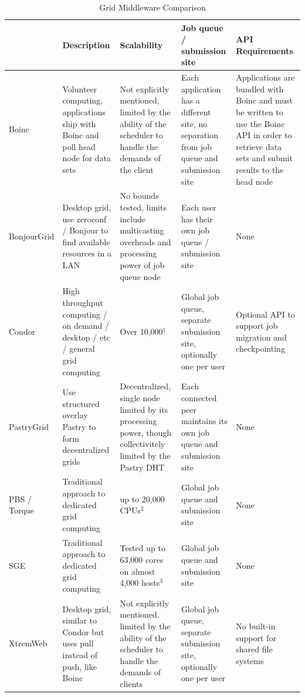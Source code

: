 \documentclass[conference]{IEEEtran}
\begin{document}
\begin{table}[ht]
\small{
\centering
\begin{tabular}[c]{|p{1.4cm}||p{3.475cm}|p{3.475cm}|p{3.475cm}|p{3.475cm}|} \hline
& Description & Scalability & Job queue / submission site & API Requirements \\ \hline \hline
Boinc &
Volunteer computing, applications ship with Boinc and poll head node for data
sets &
Not explicitly mentioned, limited by the ability of the scheduler to handle
the demands of the client &
Each application has a different site, no separation from job queue and
submission site &
Applications are bundled with Boinc and must be written to use the Boinc API
in order to retrieve data sets and submit results to the head node
\\ \hline
BonjourGrid &
Desktop grid, use zeroconf / Bonjour to find available resources in a LAN &
No bounds tested, limits include multicasting overheads and processing power
of job queue node &
Each user has their own job queue / submission site &
None \\ \hline
Condor &
High throughput computing / on demand / desktop / etc / general grid computing &
Over 10,000$^{1}$ &
Global job queue, separate submission site, optionally one per user &
Optional API to support job migration and checkpointing \\ \hline
PastryGrid &
Use structured overlay Pastry to form decentralized grids &
Decentralized, single node limited by its processing power, though
collectivitely limited by the Pastry DHT &
Each connected peer maintains its own job queue and submission site &
None \\ \hline
PBS / Torque~\cite{torque} &
Traditional approach to dedicated grid computing &
up to 20,000 CPUs$^{2}$ &
Global job queue and submission site &
None
\\ \hline
SGE &
Traditional approach to dedicated grid computing &
Tested up to 63,000 cores on almost 4,000 hosts$^{3}$ &
Global job queue and submission site &
None
\\ \hline
XtremWeb &
Desktop grid, similar to Condor but uses pull instead of push, like Boinc &
Not explicitly mentioned, limited by the ability of the scheduler to handle
the demands of clients &
Global job queue, separate submission site, optionally one per user &
No built-in support for shared file systems
\\ \hline
\end{tabular}
\caption{Grid Middleware Comparison}
\label{tab:grid}
}
\end{table}
\end{document}
